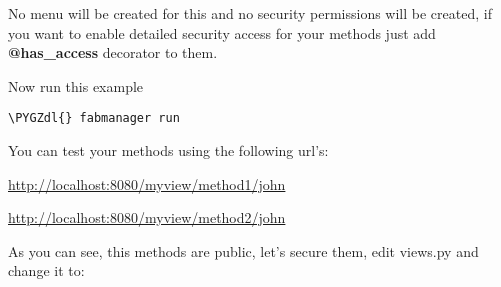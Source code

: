 \documentclass[letterpaper,10pt,english]{sphinxmanual}
\def\PYGZdl{\char`\$}
\begin{document}
No menu will be created for this and no security permissions will be created,
if you want to enable detailed security access for your methods just add \textbf{@has\_access} decorator to them.

Now run this example

\begin{Verbatim}[commandchars=\\\{\}]
\PYGZdl{} fabmanager run
\end{Verbatim}

You can test your methods using the following url's:

\url{http://localhost:8080/myview/method1/john}

\url{http://localhost:8080/myview/method2/john}

As you can see, this methods are public, let's secure them, edit views.py and change it to:
\end{document}
